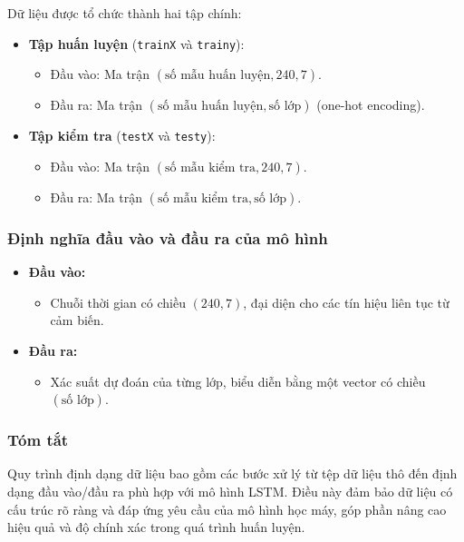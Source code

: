 Dữ liệu được tổ chức thành hai tập chính:
\begin{itemize}
    \item \textbf{Tập huấn luyện} (\texttt{trainX} và \texttt{trainy}):
    \begin{itemize}
        \item Đầu vào: Ma trận $(\text{số mẫu huấn luyện}, 240, 7)$.
        \item Đầu ra: Ma trận $(\text{số mẫu huấn luyện}, \text{số lớp})$ (one-hot encoding).
    \end{itemize}

    \item \textbf{Tập kiểm tra} (\texttt{testX} và \texttt{testy}):
    \begin{itemize}
        \item Đầu vào: Ma trận $(\text{số mẫu kiểm tra}, 240, 7)$.
        \item Đầu ra: Ma trận $(\text{số mẫu kiểm tra}, \text{số lớp})$.
    \end{itemize}
\end{itemize}

\subsubsection{Định nghĩa đầu vào và đầu ra của mô hình}

\begin{itemize}
    \item \textbf{Đầu vào:}
    \begin{itemize}
        \item Chuỗi thời gian có chiều $(240, 7)$, đại diện cho các tín hiệu liên tục từ cảm biến.
    \end{itemize}

    \item \textbf{Đầu ra:}
    \begin{itemize}
        \item Xác suất dự đoán của từng lớp, biểu diễn bằng một vector có chiều $(\text{số lớp})$.
    \end{itemize}
\end{itemize}

\subsubsection{Tóm tắt}

Quy trình định dạng dữ liệu bao gồm các bước xử lý từ tệp dữ liệu thô đến định dạng đầu vào/đầu ra phù hợp với mô hình LSTM. Điều này đảm bảo dữ liệu có cấu trúc rõ ràng và đáp ứng yêu cầu của mô hình học máy, góp phần nâng cao hiệu quả và độ chính xác trong quá trình huấn luyện.

